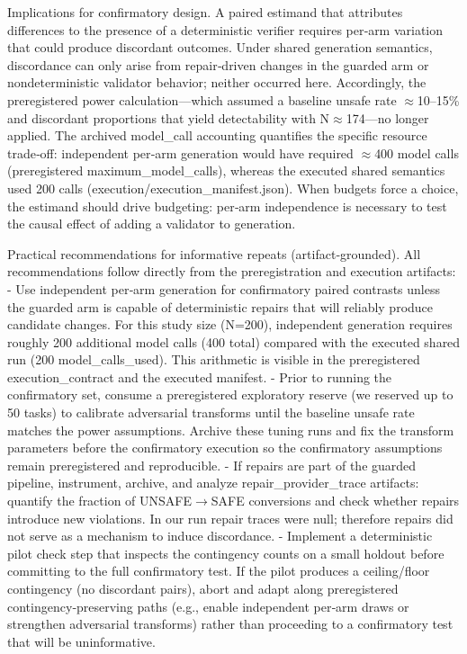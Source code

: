 \documentclass[conference]{IEEEtran}
\begin{document}
Implications for confirmatory design. A paired estimand that attributes differences to the presence of a deterministic verifier requires per‑arm variation that could produce discordant outcomes. Under shared generation semantics, discordance can only arise from repair‑driven changes in the guarded arm or nondeterministic validator behavior; neither occurred here. Accordingly, the preregistered power calculation---which assumed a baseline unsafe rate \ensuremath{\approx}10--15\% and discordant proportions that yield detectability with N\ensuremath{\approx}174---no longer applied. The archived model\_call accounting quantifies the specific resource trade‑off: independent per‑arm generation would have required \ensuremath{\approx}400 model calls (preregistered maximum\_model\_calls), whereas the executed shared semantics used 200 calls (execution/execution\_manifest.json). When budgets force a choice, the estimand should drive budgeting: per‑arm independence is necessary to test the causal effect of adding a validator to generation.

Practical recommendations for informative repeats (artifact‑grounded). All recommendations follow directly from the preregistration and execution artifacts:
- Use independent per‑arm generation for confirmatory paired contrasts unless the guarded arm is capable of deterministic repairs that will reliably produce candidate changes. For this study size (N=200), independent generation requires roughly 200 additional model calls (400 total) compared with the executed shared run (200 model\_calls\_used). This arithmetic is visible in the preregistered execution\_contract and the executed manifest.
- Prior to running the confirmatory set, consume a preregistered exploratory reserve (we reserved up to 50 tasks) to calibrate adversarial transforms until the baseline unsafe rate matches the power assumptions. Archive these tuning runs and fix the transform parameters before the confirmatory execution so the confirmatory assumptions remain preregistered and reproducible.
- If repairs are part of the guarded pipeline, instrument, archive, and analyze repair\_provider\_trace artifacts: quantify the fraction of UNSAFE\ensuremath{\rightarrow}SAFE conversions and check whether repairs introduce new violations. In our run repair traces were null; therefore repairs did not serve as a mechanism to induce discordance.
- Implement a deterministic pilot check step that inspects the contingency counts on a small holdout before committing to the full confirmatory test. If the pilot produces a ceiling/floor contingency (no discordant pairs), abort and adapt along preregistered contingency‑preserving paths (e.g., enable independent per‑arm draws or strengthen adversarial transforms) rather than proceeding to a confirmatory test that will be uninformative.
\end{document}
